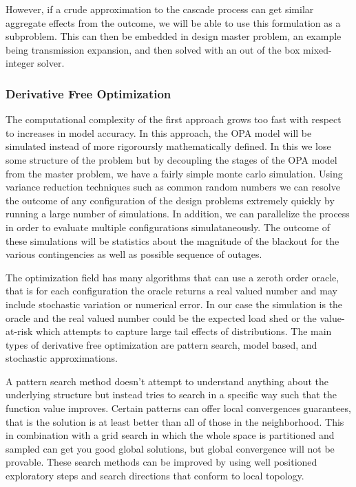 \documentclass[class=report]{standalone}
\begin{document}
 However, if a crude approximation to the cascade process can get similar aggregate effects from the outcome, we will be able to use this formulation as a subproblem.  This can then be embedded in design master problem, an example being transmission expansion, and then solved with an out of the box mixed-integer solver.

\subsubsection{Derivative Free Optimization}
The computational complexity of the first approach grows too fast with respect to increases in model accuracy.  In this approach, the OPA model will be simulated instead of more rigoroursly mathematically defined.  In this we lose some structure of the problem but by decoupling the stages of the OPA model from the master problem, we have a fairly simple monte carlo simulation.  Using variance reduction techniques such as common random numbers we can resolve the outcome of any configuration of the design problems extremely quickly by running a large number of simulations.  In addition, we can parallelize the process in order to evaluate multiple configurations simulataneously.  The outcome of these simulations will be statistics about the magnitude of the blackout for the various contingencies as well as possible sequence of outages.

The optimization field has many algorithms that can use a zeroth order oracle, that is for each configuration the oracle returns a real valued number and may include stochastic variation or numerical error.  In our case the simulation is the oracle and the real valued number could be the expected load shed or the value-at-risk which attempts to capture large tail effects of distributions.  The main types of derivative free optimization are pattern search, model based, and stochastic approximations.  

A pattern search method doesn't attempt to understand anything about the underlying structure but instead tries to search in a specific way such that the function value improves.  Certain patterns can offer local convergences guarantees, that is the solution is at least better than all of those in the neighborhood.  This in combination with a grid search in which the whole space is partitioned and sampled can get you good global solutions, but global convergence will not be provable.  These search methods can be improved by using well positioned exploratory steps and search directions that conform to local topology.
\end{document}
